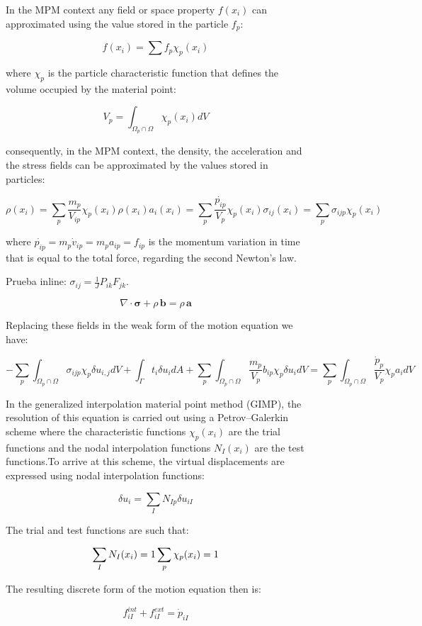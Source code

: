 \documentclass[11pt,a4paper]{article}
\begin{document}
\begin{figure}[h]
In the MPM context any field or space property $f(x_i)$ can approximated using the value stored in the particle $f_p$:

$$ f(x_i) = \sum f_p \chi_p (x_i) $$

where $\chi_p$ is the particle characteristic function that defines the volume occupied by the material point:

$$ V_p = \int_{\Omega_p \cap \Omega} \chi_p(x_i) dV $$

consequently, in the MPM context, the density, the acceleration and the stress fields can be approximated by the values stored in particles:

$$ \rho(x_i) = \sum_p \frac{m_p}{V_{ip}} \chi_p(x_i) \rho(x_i) a_i(x_i) = \sum_p \frac{\dot{p_{ip}}}{V_p} \chi_p(x_i) \sigma_{i j}(x_i) = \sum_p \sigma_{i j p} \chi_p(x_i) $$

where $\dot{p_{ip}} = m_p \dot{v}_{ip} = m_p a_{ip} = f_{ip}$ is the momentum variation in time that is equal to the total force, regarding the second Newton's law. 

Prueba inline: $ \sigma_{ij} = \frac{1}{J} P_{ik} F_{jk} $.

$$
\nabla \cdot \boldsymbol{\sigma} + \rho\,\mathbf{b} = \rho\,\mathbf{a}
$$

Replacing these fields in the weak form of the motion equation we have:

$$ -\sum_p \int_{\Omega_p \cap \Omega} \sigma_{i j p} \chi_p \delta u_{i, j} dV  + \int_{\Gamma} t_i \delta u_i dA+ \sum_p \int_{\Omega_p \cap \Omega} \frac{m_p}{V_p} b_{i p} \chi_p \delta u_i dV 
= \sum_p \int_{\Omega_p \cap \Omega} \frac{\dot{p}_p}{V_p} \chi_p a_i dV $$

In the generalized interpolation material point method (GIMP), the resolution of this equation is carried out using a Petrov–Galerkin scheme where the characteristic functions $\chi_p(x_i)$ are the trial functions and the nodal interpolation functions $N_I(x_i)$ are the test functions.To arrive at this scheme, the virtual displacements are expressed using nodal interpolation functions:

$$ \delta u_i=\sum_I N_{I p} \delta u_{i I} $$

The trial and test functions are such that:

$$ \sum_I N_{I}(x_i) = 1 \\ \sum_p \chi_p(x_i) = 1 $$

The resulting discrete form of the motion equation then is:

$$ f_{iI}^{int} + f_{iI}^{ext} = \dot{p}_{iI} $$


\end{figure}
\end{document}
